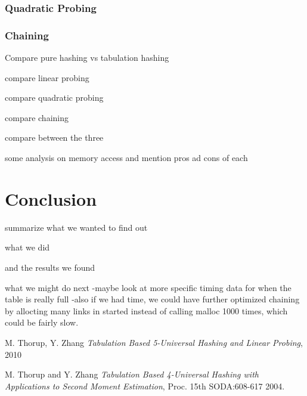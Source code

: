 \documentclass[11pt]{article}
\begin{document}
\subsubsection{Quadratic Probing}

\subsubsection{Chaining}



Compare pure hashing vs tabulation hashing

compare linear probing

compare quadratic probing

compare chaining

compare between the three

some analysis on memory access  and mention pros ad cons of each


\section{Conclusion}
summarize what we wanted to find out

what we did

and the results we found

what we might do next
-maybe look at more specific timing data for when the table is really full
-also if we had time, we could have further optimized chaining by allocting many links in started 
instead of calling malloc 1000 times, which could be fairly slow.



\begin{thebibliography}{77}

M. Thorup, Y. Zhang
\emph{Tabulation Based 5-Universal Hashing and Linear Probing},
2010

M. Thorup and Y. Zhang 
\emph{Tabulation Based 4-Universal Hashing with Applications to Second Moment Estimation},
Proc. 15th SODA:608-617 2004.


\end{thebibliography}


\end{document}
